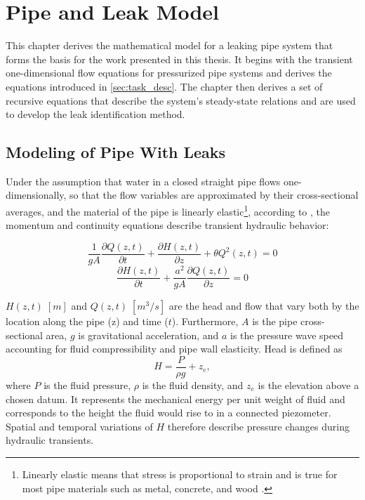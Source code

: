 \chapter{Pipe and Leak Model}
\label{chap:model}

This chapter derives the mathematical model for a leaking pipe system that forms the basis for the work presented in this thesis. It begins with the transient one-dimensional flow equations for pressurized pipe systems and derives the equations introduced in \autoref{sec:task_desc}. The chapter then derives a set of recursive equations that describe the system's steady-state relations and are used to develop the leak identification method.

\section{Modeling of Pipe With Leaks}

Under the assumption that water in a closed straight pipe flows one-dimensionally, so that the flow variables are approximated by their cross-sectional averages, and the material of the pipe is linearly elastic\footnote{Linearly elastic means that stress is proportional to strain and is true for most pipe materials such as metal, concrete, and wood \cite[p.~27]{chaudhry2013}.}, according to \cite[pp.~27-33]{chaudhry2013}, the momentum and continuity equations describe transient hydraulic behavior:

\begin{equation}
\label{eq:momentum}
\frac{1}{gA}\frac{\partial Q(z,t)}{\partial t}
+ \frac{\partial H(z,t)}{\partial z}
+ \theta Q^{2}(z,t) = 0
\end{equation}
\begin{equation}
\label{eq:continuity}
\frac{\partial H(z,t)}{\partial t}
+ \frac{a^{2}}{gA}\frac{\partial Q(z,t)}{\partial z} = 0
\end{equation}

$H(z,t)\;[m]$ and $Q(z,t)\;[m^3/s]$ are the head and flow that vary both by the location along the pipe (\gls{z}) and time ($t$). Furthermore, $A$ is the pipe cross-sectional area, $g$ is gravitational acceleration, and $a$ is the pressure wave speed accounting for fluid compressibility and pipe wall elasticity. Head is defined as
\[
H = \frac{P}{\rho g} + z_e,
\]
where $P$ is the fluid pressure, $\rho$ is the fluid density, and $z_e$ is the elevation above a chosen datum. It represents the mechanical energy per unit weight of fluid and corresponds to the height the fluid would rise to in a connected piezometer. Spatial and temporal variations of $H$ therefore describe pressure changes during hydraulic transients.\\

